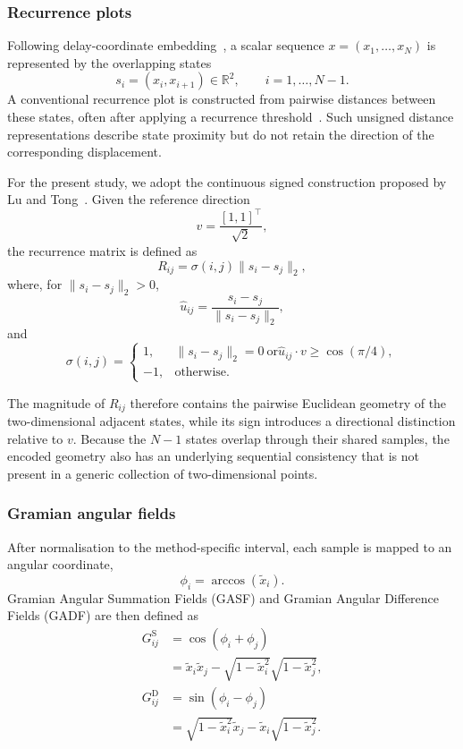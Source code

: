 \documentclass[5p]{elsarticle}
\begin{document}
\subsubsection{Recurrence plots}
\label{sec:rp_encoding}

Following delay-coordinate embedding~\cite{takens1981detecting}, a scalar sequence \(x=(x_1,\ldots,x_N)\) is represented by the overlapping states
\[
s_i=(x_i,x_{i+1})\in\mathbb{R}^2,
\qquad i=1,\ldots,N-1.
\]
A conventional recurrence plot is constructed from pairwise distances between these states, often after applying a recurrence threshold~\cite{eckmann1987recurrence,marwan2007recurrence}. Such unsigned distance representations describe state proximity but do not retain the direction of the corresponding displacement.

For the present study, we adopt the continuous signed construction proposed by Lu and Tong~\cite{lu2019robust}. Given the reference direction
\[
v=\frac{[1,1]^\top}{\sqrt{2}},
\]
the recurrence matrix is defined as
\begin{equation}
R_{ij}=\sigma(i,j)\lVert s_i-s_j\rVert_2,
\label{eq:FormulaRP}
\end{equation}
where, for \(\lVert s_i-s_j\rVert_2>0\),
\[
\hat u_{ij}=\frac{s_i-s_j}{\lVert s_i-s_j\rVert_2},
\]
and
\begin{equation}
\sigma(i,j)=
\begin{cases}
1,
&
\lVert s_i-s_j\rVert_2=0
\ \text{or}
\hat u_{ij}\cdot v\geq\cos(\pi/4),
\\
-1,
&
\text{otherwise}.
\end{cases}
\end{equation}

The magnitude of \(R_{ij}\) therefore contains the pairwise Euclidean geometry of the two-dimensional adjacent states, while its sign introduces a directional distinction relative to \(v\). Because the \(N-1\) states overlap through their shared samples, the encoded geometry also has an underlying sequential consistency that is not present in a generic collection of two-dimensional points.

\subsubsection{Gramian angular fields}
\label{sec:gaf_encoding}

After normalisation to the method-specific interval, each sample is mapped to an angular coordinate,
\[
\phi_i=\arccos(\tilde{x}_i).
\]
Gramian Angular Summation Fields (GASF) and Gramian Angular Difference Fields (GADF) are then defined as~\cite{wang2015encoding}
\begin{align}
G^{\mathrm{S}}_{ij}
&=\cos(\phi_i+\phi_j) \nonumber\\
&=\tilde{x}_i\tilde{x}_j
-\sqrt{1-\tilde{x}_i^2}\sqrt{1-\tilde{x}_j^2},
\label{eq:gasf_indexed}
\\
G^{\mathrm{D}}_{ij}
&=\sin(\phi_i-\phi_j) \nonumber\\
&=\sqrt{1-\tilde{x}_i^2}\tilde{x}_j
-\tilde{x}_i\sqrt{1-\tilde{x}_j^2}.
\label{eq:gadf_indexed}
\end{align}
\end{document}
